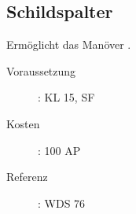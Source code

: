 \subsection{Schildspalter}
\label{sf.schildspalter}
Ermöglicht das Manöver .
\begin{description}
    \item[Voraussetzung]:
        KL 15, SF 
    \item [Kosten]:
        100 AP
    \item [Referenz]:
        WDS 76
\end{description}
